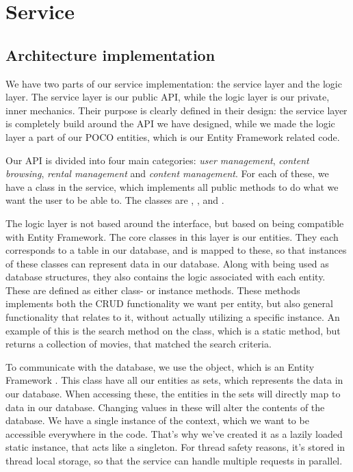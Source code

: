 \section{Service}
\label{Implementation_Service}

\subsection[Architecture]{Architecture implementation}
\label{Implementation_Service_Architecture}
We have two parts of our service implementation: the service layer and the logic layer. The service layer is our public API, while the logic layer is our private, inner mechanics. Their purpose is clearly defined in their design: the service layer is completely build around the API we have designed, while we made the logic layer a part of our POCO entities, which is our Entity Framework related code.

Our API is divided into four main categories: \emph{user management}, \emph{content browsing}, \emph{rental management} and \emph{content management}. For each of these, we have a class in the service, which implements all public methods to do what we want the user to be able to. The classes are , ,  and . 

The logic layer is not based around the interface, but based on being compatible with Entity Framework. The core classes in this layer is our entities. They each corresponds to a table in our database, and is mapped to these, so that instances of these classes can represent data in our database. Along with being used as database structures, they also contains the logic associated with each entity. These are defined as either class- or instance methods. These methods implements both the CRUD functionality we want per entity, but also general functionality that relates to it, without actually utilizing a specific instance. An example of this is the search method on the  class, which is a static method, but returns a collection of movies, that matched the search criteria. 

To communicate with the database, we use the  object, which is an Entity Framework . This class have all our entities as sets, which represents the data in our database. When accessing these, the entities in the sets will directly map to data in our database. Changing values in these will alter the contents of the database. We have a single instance of the context, which we want to be accessible everywhere in the code. That's why we've created it as a lazily loaded static instance, that acts like a singleton. For thread safety reasons, it's stored in thread local storage, so that the service can handle multiple requests in parallel.

